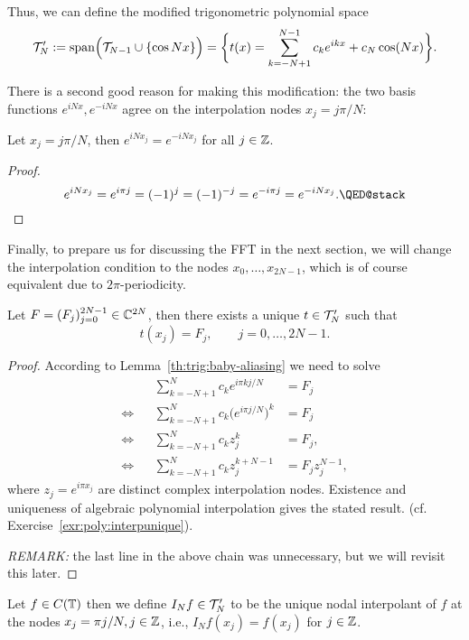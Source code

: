 Thus, we can define the modified trigonometric polynomial space 
\[
  \mathcal{T}_N' := {\rm span}\Big(\mathcal{T}_{N-1} \cup \{ \cos N x \} \Big)
    =  \bigg\{ t(x) = \sum_{k = -N+1}^{N-1} c_k e^{ikx} + c_N \cos(Nx) \bigg\}.  
\]

There is a second good reason for making this modification: the two 
basis functions $e^{iNx}, e^{-iNx}$ agree on the interpolation nodes 
$x_j = j \pi / N$: 

\begin{lemma} \label{th:trig:baby-aliasing}
  Let $x_j = j \pi / N$, then $e^{iN x_j} = e^{-iNx_j}$ for all 
  $j \in \mathbb{Z}$.
\end{lemma}
\begin{proof}
  \[
    e^{iNx_j} = e^{i \pi j} = (-1)^j = (-1)^{-j} = e^{-i\pi j} = e^{-iNx_j}.
    \qedhere
  \]
\end{proof}


Finally, to prepare us for discussing the FFT in the next section, we will
change the interpolation condition to the nodes $x_0, \dots, x_{2N-1}$, which is
of course equivalent due to $2\pi$-periodicity.

\begin{lemma}
  Let $F  = (F_j)_{j = 0}^{2N-1} \in \mathbb{C}^{2N}$, then there exists a unique 
  $t \in \mathcal{T}_N'$ such that 
  \[
    t(x_j) = F_j, \qquad j = 0, \dots, 2N-1.
  \]
\end{lemma}
\begin{proof}
  According to Lemma~\ref{th:trig:baby-aliasing} we need to solve 
  \begin{align*}
      && \sum_{k = -N+1}^N c_k e^{i\pi k j/N} &= F_j \\ 
      \Leftrightarrow &&
      \sum_{k = -N+1}^N c_k \big(e^{i\pi j/N}\big)^k &= F_j \\ 
      \Leftrightarrow &&
      \sum_{k = -N+1}^N c_k z_j^k &= F_j, \\ 
      \Leftrightarrow &&
      \sum_{k = -N+1}^N c_k z_j^{k+N-1} &= F_j z_j^{N-1},
  \end{align*}
  where $z_j = e^{i\pi x_j}$ are distinct complex interpolation nodes. Existence
  and uniqueness of algebraic polynomial interpolation gives the stated result.
  (cf. Exercise~\ref{exr:poly:interpunique}).

  {\it REMARK: } the last line in the above chain was unnecessary, but we will 
  revisit this later.
\end{proof}

\medskip 

\begin{definition}
  Let $f \in C(\mathbb{T})$ then we define $I_N f \in \mathcal{T}_N'$ to be the unique nodal
  interpolant of $f$ at the nodes $x_j = \pi j / N, j \in \mathbb{Z}$, i.e., $I_N f(x_j)
  = f(x_j)$ for $j \in \mathbb{Z}$.
\end{definition}

